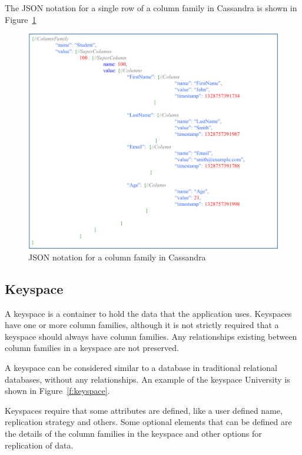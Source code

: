 The JSON notation for a single row of a column family in Cassandra is
shown in Figure~\ref{f:columnfamilyJSON} 

\begin{figure}[h]
	\centering
	\includegraphics[width=\textwidth]{./figure/Example/JSON_ColumnFamily_1row.png}
	\caption{JSON notation for a column family in
	Cassandra}\label{f:columnfamilyJSON}
\end{figure} 

\subsection{Keyspace}
 A keyspace is a container to hold the data that the
application uses.  Keyspaces have one or more column families,   although it is not strictly
required that a keyspace should always have column families.  Any relationships
existing between column families in a keyspace are not preserved. 

A keyspace can be considered similar to a database in traditional relational
databases,   without any relationships.  An example of the keyspace
University is shown in Figure~\ref{f:keyspace}. 

Keyspaces require that some attributes are defined,   like a user defined name,  
replication strategy and others.  Some optional elements that can be defined are
the details of the column families in the keyspace and other options
for replication of data. 
 
